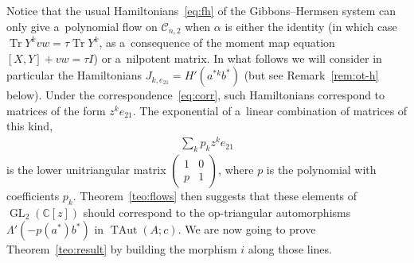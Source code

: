 \documentclass[11pt]{article}
\newcommand{\bb}[1]{\mathbb{#1}}
\newcommand{\smm}[1]{\left(\begin{smallmatrix} #1\end{smallmatrix}\right)}
\DeclareMathOperator{\tr}{Tr}
\DeclareMathOperator{\GL}{GL}
\DeclareMathOperator{\TAut}{TAut}
\begin{document}
Notice that the usual Hamiltonians~\eqref{eq:fh} of the Gibbons--Hermsen system can only give a~polynomial
f\/low on \(\mathcal{C}_{n,2}\) when \(\alpha\) is either the identity (in which case \(\tr Y^{k}vw = \tau
\tr Y^{k}\), as a~consequence of the moment map equation \([X,Y]+vw = \tau I\)) or a~nilpotent matrix.
In what follows we will consider in particular the Hamiltonians \(J_{k,e_{21}} = H'(a^{*k}b^{*})\) (but see
Remark~\ref{rem:ot-h} below).
Under the correspondence~\eqref{eq:corr}, such Hamiltonians correspond to matrices of the form
\(z^{k}e_{21}\).
The exponential of a~linear combination of matrices of this kind,
\begin{gather*}
\sum_{k}p_{k}z^{k}e_{21}
\end{gather*}
is the lower unitriangular matrix \(\smm{1 & 0
\\
p & 1}\), where \(p\) is the polynomial with coef\/f\/icients \(p_{k}\).
Theo\-rem~\ref{teo:flows} then suggests that these elements of \(\GL_{2}(\bb{C}[z])\) should correspond to
the op-triangular automorphisms \(\Lambda'(-p(a^{*})b^{*})\) in \(\TAut(A;c)\).
We are now going to prove Theorem~\ref{teo:result} by building the morphism \(i\) along those lines.
\end{document}

